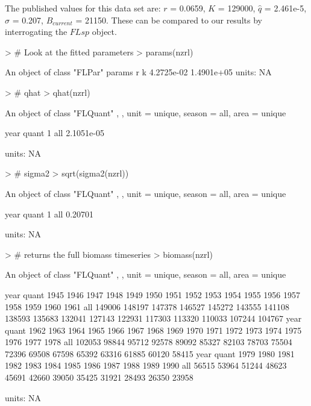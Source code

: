 \documentclass[a4paper]{article}
\begin{document}
The published values for this data set are:
$r$ = 0.0659, 
$K$ = 129000, 
$\hat{q}$ = 2.461e-5, 
$\sigma$ = 0.207, 
$B_{current}$ = 21150. 
These can be compared to our results by interrogating the $FLsp$ object.
\begin{center}
\begin{minipage}[H]{0.95\textwidth}%
\begin{shaded}%
\begin{Schunk}
\begin{Sinput}
> # Look at the fitted parameters
> params(nzrl)
\end{Sinput}
\begin{Soutput}
An object of class "FLPar"
params
         r          k 
4.2725e-02 1.4901e+05 
units:  NA 
\end{Soutput}
\begin{Sinput}
> # qhat
> qhat(nzrl)
\end{Sinput}
\begin{Soutput}
An object of class "FLQuant"
, , unit = unique, season = all, area = unique

     year
quant 1         
  all 2.1051e-05

units:  NA 
\end{Soutput}
\begin{Sinput}
> # sigma2
> sqrt(sigma2(nzrl))
\end{Sinput}
\begin{Soutput}
An object of class "FLQuant"
, , unit = unique, season = all, area = unique

     year
quant 1      
  all 0.20701

units:  NA 
\end{Soutput}
\begin{Sinput}
> # returns the full biomass timeseries
> biomass(nzrl)
\end{Sinput}
\begin{Soutput}
An object of class "FLQuant"
, , unit = unique, season = all, area = unique

     year
quant 1945   1946   1947   1948   1949   1950   1951   1952   1953   1954   1955   1956   1957   1958   1959   1960   1961  
  all 149006 148197 147378 146527 145272 143555 141108 138593 135683 132041 127143 122931 117303 113320 110033 107244 104767
     year
quant 1962   1963   1964   1965   1966   1967   1968   1969   1970   1971   1972   1973   1974   1975   1976   1977   1978  
  all 102053  98844  95712  92578  89092  85327  82103  78703  75504  72396  69508  67598  65392  63316  61885  60120  58415
     year
quant 1979   1980   1981   1982   1983   1984   1985   1986   1987   1988   1989   1990  
  all  56515  53964  51244  48623  45691  42660  39050  35425  31921  28493  26350  23958

units:  NA 
\end{Soutput}
\end{Schunk}
\end{shaded}%
\end{minipage}
\end{center}
\end{document}
